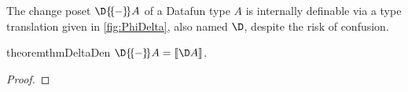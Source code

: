 

The change poset $\D\incdens A$ of a Datafun type $A$ is internally definable
via a type translation given in \cref{fig:PhiDelta}, also named $\D$, despite
the risk of confusion. 



\begin{restatable}{theorem}{thmDeltaDen}
  \label{thm:delta-den}
  \(\D\incdens A = \den{\D A}\).
\end{restatable}
\begin{proof}
\end{proof}
